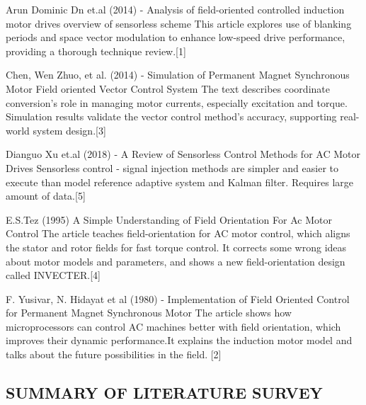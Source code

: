 \hspace{0.2in}Arun Dominic Dn et.al (2014) - Analysis of field-oriented controlled induction motor drives overview of sensorless scheme This article  explores use of blanking periods and space vector modulation to enhance low-speed drive performance, providing a thorough technique review.[1]

\vspace{10mm} %

Chen, Wen Zhuo, et al. (2014) -   Simulation of Permanent Magnet Synchronous Motor Field oriented Vector Control System   The text describes coordinate conversion's role in managing motor currents, especially excitation and torque.  Simulation results validate the vector control method's accuracy, supporting real-world system design.[3]


\vspace{10mm} %

Dianguo Xu  et.al (2018) -  A Review of Sensorless Control Methods for AC Motor Drives  Sensorless control - signal injection methods are simpler and easier to execute than model reference adaptive system and Kalman filter. Requires large amount of data.[5]




\vspace{10mm} %

E.S.Tez (1995) A Simple Understanding of Field Orientation For Ac Motor Control The article teaches field-orientation for AC motor control, which aligns the stator and rotor fields for fast torque control. It corrects some wrong ideas about motor models and parameters, and shows a new field-orientation design called INVECTER.[4]

\vspace{10mm} %

F. Yusivar, N. Hidayat et al (1980) -  Implementation of Field Oriented Control for Permanent Magnet Synchronous Motor     The article shows how microprocessors can control AC machines better with field orientation, which improves their dynamic performance.It explains the induction motor model and talks about the future possibilities in the field. [2]



\subsection{SUMMARY OF LITERATURE SURVEY}


